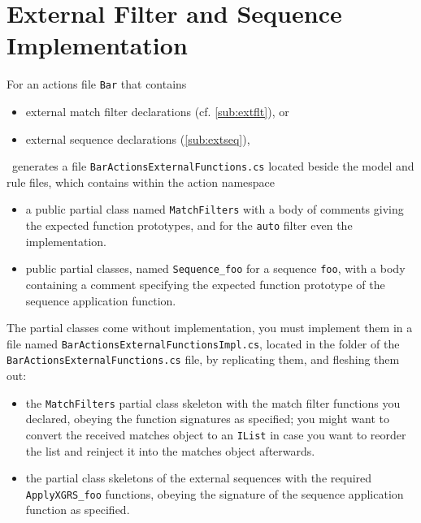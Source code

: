 \pagebreak

\section{External Filter and Sequence Implementation}\label{sub:extfltseqimpl}

For an actions file \texttt{Bar} that contains
\begin{itemize}
	\item external match filter declarations (cf. \ref{sub:extflt}), or
	\item external sequence declarations (\ref{sub:extseq}),
\end{itemize}
\GrG~generates a file \texttt{BarActionsExternalFunctions.cs} located beside the model and rule files, which contains within the action namespace 
\begin{itemize}
	\item a public partial class named \texttt{MatchFilters} with a body of comments giving the expected function prototypes, and for the \texttt{auto} filter even the implementation.
	\item public partial classes, named \texttt{Sequence\_foo} for a sequence \texttt{foo}, with a body containing a comment specifying the expected function prototype of the sequence application function.
\end{itemize}

\noindent The partial classes come without implementation, you must implement them in a file named \texttt{Bar\-Actions\-External\-FunctionsImpl.cs}, located in the folder of the \texttt{Bar\-Actions\-External\-Functions.cs} file, by replicating them, and fleshing them out:
\begin{itemize}
	\item the \texttt{MatchFilters} partial class skeleton with the match filter functions you declared, obeying the function signatures as specified; you might want to convert the received matches object to an \texttt{IList} in case you want to reorder the list and reinject it into the matches object afterwards.
	\item the partial class skeletons of the external sequences with the required \texttt{ApplyXGRS\_foo} functions, obeying the signature of the sequence application function as specified.
\end{itemize}

